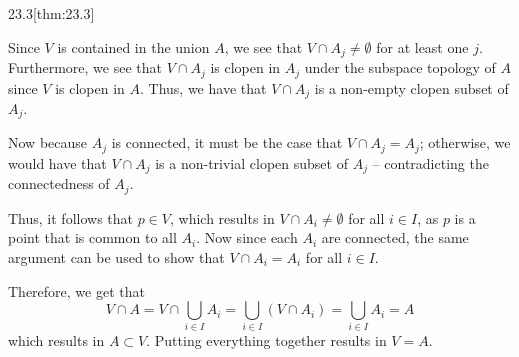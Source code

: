 \begin{thmBox}{23.3}[thm:23.3]
\begin{proofBox}
        \baseSkip

        Since \( V \) is contained in the union \( A \), we see that 
        \( V \cap A_{ j } \neq \emptyset \) for at least one \( j \).
        Furthermore, we see that \( V \cap A_{ j } \) is clopen in 
        \( A_{ j } \) under the subspace topology of \( A \) since \( V \) is 
        clopen in \( A \).
        Thus, we have that \( V \cap A_{ j } \) is a non-empty clopen subset
        of \( A_{ j } \).

        \baseSkip 

        Now because \( A_{ j } \) is connected, it must be the case that 
        \( V \cap A_{ j } = A_{ j } \); otherwise, we would have that 
        \( V \cap A_{ j } \) is a non-trivial clopen subset of \( A_{ j } \) --
        contradicting the connectedness of \( A_{ j } \).

        \baseSkip

        Thus, it follows that \( p \in V \), which results in 
        \( V \cap A_{ i } \neq \emptyset  \) for all \( i \in I \), as \( p \)
        is a point that is common to all \( A_{ i } \).
        Now since each \( A_{ i } \) are connected, the same argument can be 
        used to show that \( V \cap A_{ i } = A_{ i } \) for all \( i \in I \).
        
        \baseSkip

        Therefore, we get that 
        \begin{equation*}
            V \cap A
            =
            V \cap \bigcup_{ i \in I } A_{ i }  
            =
            \bigcup_{ i \in I } ( V \cap A_{ i } )
            =
            \bigcup_{ i \in I } A_{ i }
            =
            A
        \end{equation*}
        which results in \( A \subset V \).
        Putting everything together results in \( V = A \).
    \end{proofBox}
\end{thmBox}

